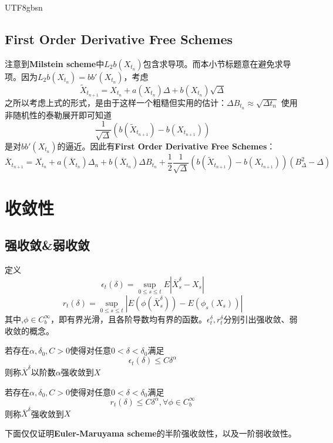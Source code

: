 \documentclass{article}
\begin{document}
\begin{CJK*}{UTF8}{gbsn}
\subsection{First Order Derivative Free Schemes}
注意到\textbf{Milstein scheme}中$L_2b(X_{t_n})$包含求导项。而本小节标题意在避免求导项。因为$L_2b(X_{t_n})=bb'(X_{t_n})$，考虑
$$
\tilde{X}_{t_{n+1}}=X_{t_n}+a(X_{t_n})\Delta+b(X_{t_n})\sqrt{\Delta}
$$
之所以考虑上式的形式，是由于这样一个粗糙但实用的估计：$\Delta B_{t_n}\approx\sqrt{\Delta t_{n}}$
使用非随机性的泰勒展开即可知道
$$
\frac{1}{\sqrt{\Delta}}\left(b(\tilde{X}_{t_{n+1}})-b({X}_{t_{n+1}})\right)$$
是对$bb'(X_{t_n})$的逼近。因此有\textbf{First Order Derivative Free Schemes}：
$$
\overline{X}_{t_{n+1}}=\overline{X_{t_n}}+a(\overline{X}_{t_{n}})\Delta_n+b(\overline{X}_{t_{n}})\Delta B_{t_n}+\frac{1}{2}\frac{1}{\sqrt{\Delta}}\left(b(\tilde{X}_{t_{n+1}})-b({X}_{t_{n+1}})\right)(B_\Delta^2-\Delta)    
$$
\section{收敛性}
\subsection{强收敛\&弱收敛}
定义
$$
\epsilon_{t}(\delta)=\sup_{0\leq s\leq t}E|\overline{X}_{s}^{\delta}-X_{s}|
$$
$$
r_{t}(\delta)=\sup_{0\le s\le t}\left|E(\phi(\bar{X}_{s}^{\delta}))-E(\phi_{s}({X}_{s}))\right|
$$
其中,$\phi\in C_b^\infty$，即有界光滑，且各阶导数均有界的函数。$\epsilon_{t}^{\delta},r_{t}^{\delta}$分别引出强收敛、弱收敛的概念。
\begin{definition}[强收敛]
    若存在$\alpha,\delta_0,C>0$使得对任意$0<\delta<\delta_0$满足
    $$
    \epsilon_{t}(\delta)\le C\delta^\alpha
    $$
    则称$\overline{X}^\delta$以阶数$\alpha$强收敛到$X$
\end{definition}

\begin{definition}[弱收敛]
    若存在$\alpha,\delta_0,C>0$使得对任意$0<\delta<\delta_0$满足
    $$
    r_{t}(\delta)\le C\delta^\alpha,\forall\phi\in C_b^\infty
    $$
    则称$\overline{X}^\delta$强收敛到$X$
\end{definition}
下面仅仅证明\textbf{Euler-Maruyama scheme}的半阶强收敛性，以及一阶弱收敛性。


\appendix

\end{CJK*}
\end{document}
